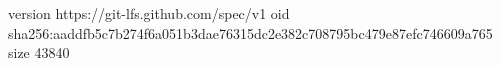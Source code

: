version https://git-lfs.github.com/spec/v1
oid sha256:aaddfb5c7b274f6a051b3dae76315dc2e382c708795bc479e87efc746609a765
size 43840
